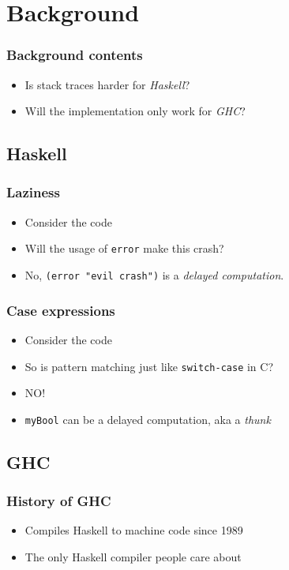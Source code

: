 \documentclass[11pt]{beamer} %
\begin{document}
\section{Background}

  \begin{frame}
   \frametitle{Background contents}
  \begin{itemize}
   \item Is stack traces harder for \emph{Haskell}?
   \item Will the implementation only work for \emph{GHC}?
  \end{itemize}
  \end{frame}


\subsection{Haskell}

  \begin{frame}
   \frametitle{Laziness}
  \begin{itemize}
   \item <1-> Consider the code
     \lazyCode
   \item <1-> Will the usage of \texttt{error} make this crash?
   \item <2-> No, \texttt{(error "evil crash")} is a \emph{delayed computation}.
  \end{itemize}
  \end{frame}

  \begin{frame}
   \frametitle{Case expressions}
  \begin{itemize}
   \item <1-> Consider the code
     \caseCode
   \item <1-> So is pattern matching just like \texttt{switch-case} in C?
   \item <2-> NO!
   \item <3-> \texttt{myBool} can be a delayed computation, aka a \emph{thunk}
  \end{itemize}
  \end{frame}

\subsection{GHC}
  \begin{frame}
   \frametitle{History of GHC}
  \begin{itemize}
   \item Compiles Haskell to machine code since 1989
   \item The only Haskell compiler people care about
  \end{itemize}
  \end{frame}
\end{document}
